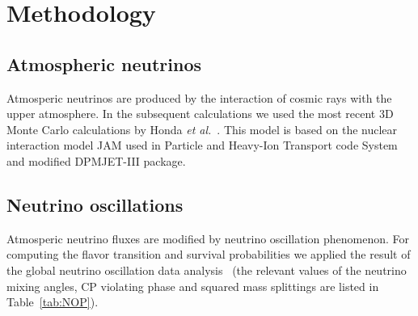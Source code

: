 \section{Methodology}
\subsection{Atmospheric neutrinos}
Atmosperic neutrinos are produced by the interaction of cosmic rays with the upper atmosphere. In the subsequent calculations we used the most recent 3D Monte Carlo calculations by Honda \textit{et al.}~\cite{Honda:2011nf}. This model is based on the nuclear interaction model JAM used in Particle and Heavy-Ion Transport code System and modified DPMJET-III package.
\subsection{Neutrino oscillations}
Atmosperic neutrino fluxes are modified by neutrino oscillation phenomenon. For computing the flavor transition and survival probabilities we applied the result of the global neutrino oscillation data analysis~\cite{Tortola:2012te} (the relevant values of the neutrino mixing angles, CP violating phase and squared mass splittings are listed in Table~\ref{tab:NOP}).
